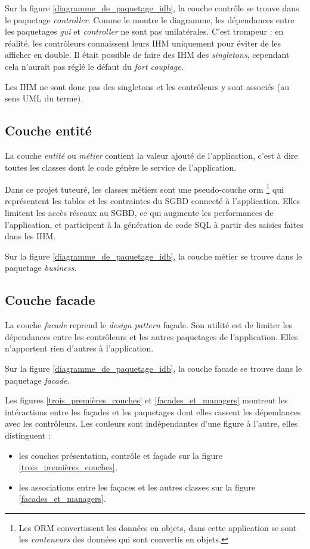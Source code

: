 Sur la figure \ref{diagramme_de_paquetage_idb}, la couche contrôle se trouve dans le paquetage \textit{controller}.
Comme le montre le diagramme, les dépendances entre les paquetages \textit{gui} et \textit{controller} ne sont pas unilatérales.
C'est trompeur : en réalité, les contrôleurs connaissent leurs IHM uniquement pour éviter de les afficher en double.
Il était possible de faire des IHM des \textit{singletons}, cependant cela n'aurait pas réglé le défaut du \textit{fort couplage}.

Les IHM ne sont donc pas des singletons et les contrôleurs y sont associés (au sens UML du terme).

\subsection{Couche entité}
La couche \textit{entité} ou \textit{métier} contient la valeur ajouté de l'application, c'est à dire toutes les classes dont le code génère le service de l'application.

Dans ce projet tuteuré, les classes métiers sont une pseudo-couche \gls{orm}
\footnote{\label{faux_orm}Les ORM convertissent les données en objets, dans cette application se sont les \textit{conteneurs} des données qui sont convertis en objets.}
qui représentent les tables et les contraintes du SGBD connecté à l'application.
Elles limitent les accès réseaux au SGBD, ce qui augmente les performances de l'application, et participent à la génération de code SQL à partir des saisies faites dans les IHM.

Sur la figure \ref{diagramme_de_paquetage_idb}, la couche métier se trouve dans le paquetage \textit{business}.

\subsection{Couche facade}
La couche \textit{facade} reprend le \textit{design pattern} façade.
Son utilité est de limiter les dépendances entre les contrôleurs et les autres paquetages de l'application.
Elles n'apportent rien d'autres à l'application.

Sur la figure \ref{diagramme_de_paquetage_idb}, la couche facade se trouve dans le paquetage \textit{facade}.

Les figures \ref{trois_premières_couches} et \ref{facades_et_managers} montrent les intéractions entre les façades et les paquetages dont elles cassent les dépendances avec les contrôleurs. Les couleurs sont indépendantes d'une figure à l'autre, elles distinguent :
\begin{itemize}
\item les couches présentation, contrôle et façade sur la figure \ref{trois_premières_couches},
\item les associations entre les façaces et les autres classes sur la figure \ref{facades_et_managers}.
\end{itemize}

